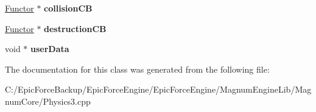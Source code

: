 \begin{DoxyCompactItemize}
\item 
\hyperlink{class_magnum_1_1_functor}{Functor} $\ast$ {\bfseries collision\+CB}\hypertarget{class_rigid_body_desc_a9c0c733bb87320ed86033fe2cfaad14a}{}\label{class_rigid_body_desc_a9c0c733bb87320ed86033fe2cfaad14a}

\item 
\hyperlink{class_magnum_1_1_functor}{Functor} $\ast$ {\bfseries destruction\+CB}\hypertarget{class_rigid_body_desc_a7b95d01916e0c7f0f5447d82190f4c9c}{}\label{class_rigid_body_desc_a7b95d01916e0c7f0f5447d82190f4c9c}

\item 
void $\ast$ {\bfseries user\+Data}\hypertarget{class_rigid_body_desc_a4a0e433f4d60f1d22129439ad86ef73a}{}\label{class_rigid_body_desc_a4a0e433f4d60f1d22129439ad86ef73a}

\end{DoxyCompactItemize}


The documentation for this class was generated from the following file\+:\begin{DoxyCompactItemize}
\item 
C\+:/\+Epic\+Force\+Backup/\+Epic\+Force\+Engine/\+Epic\+Force\+Engine/\+Magnum\+Engine\+Lib/\+Magnum\+Core/Physics3.\+cpp\end{DoxyCompactItemize}
